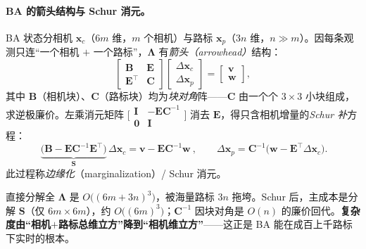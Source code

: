 \paragraph{BA 的箭头结构与 Schur 消元。}\cite{gaoxiang2019slam14}
BA 状态分相机 $\mathbf{x}_c$（$6m$ 维，$m$ 个相机）与路标 $\mathbf{x}_p$（$3n$ 维，$n\gg m$）。因每条观测只连“一个相机 $+$ 一个路标”，$\boldsymbol{\Lambda}$ 有\emph{箭头（arrowhead）}结构：
\begin{equation}
  \begin{bmatrix}\mathbf{B}&\mathbf{E}\\\mathbf{E}^\top&\mathbf{C}\end{bmatrix}
  \begin{bmatrix}\Delta\mathbf{x}_c\\\Delta\mathbf{x}_p\end{bmatrix}
  =\begin{bmatrix}\mathbf{v}\\\mathbf{w}\end{bmatrix},
  \label{eq:ba-block}
\end{equation}
其中 $\mathbf{B}$（相机块）、$\mathbf{C}$（路标块）均为\emph{块对角}阵——$\mathbf{C}$ 由一个个 $3\times3$ 小块组成，求逆极廉价。左乘消元矩阵 $\big[\begin{smallmatrix}\mathbf{I}&-\mathbf{E}\mathbf{C}^{-1}\\\mathbf{0}&\mathbf{I}\end{smallmatrix}\big]$ 消去 $\mathbf{E}$，得只含相机增量的\emph{Schur 补}方程：
\begin{equation}
  \boxed{\ \underbrace{\big(\mathbf{B}-\mathbf{E}\mathbf{C}^{-1}\mathbf{E}^\top\big)}_{\textstyle\mathbf{S}}\,\Delta\mathbf{x}_c=\mathbf{v}-\mathbf{E}\mathbf{C}^{-1}\mathbf{w}\ },\qquad
  \Delta\mathbf{x}_p=\mathbf{C}^{-1}\big(\mathbf{w}-\mathbf{E}^\top\Delta\mathbf{x}_c\big).
  \label{eq:schur}
\end{equation}
此过程称\emph{边缘化}（marginalization）/ Schur 消元\cite{gaoxiang2019slam14}。

\begin{insight}[$O(\text{相机}^3)$ 而非 $O(n^3)$]
直接分解全 $\boldsymbol{\Lambda}$ 是 $O\big((6m+3n)^3\big)$，被海量路标 $3n$ 拖垮。Schur 后，主成本是分解 $\mathbf{S}$（仅 $6m\times6m$），约 $O\big((6m)^3\big)$；$\mathbf{C}^{-1}$ 因块对角是 $O(n)$ 的廉价回代。\textbf{复杂度由“相机$+$路标总维立方”降到“相机维立方”}——这正是 BA 能在成百上千路标下实时的根本。
\end{insight}


